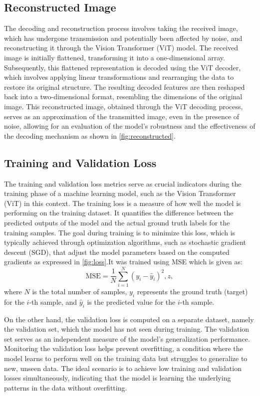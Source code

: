 \documentclass[10pt,twocolumn]{IEEEtran}
\begin{document}
\subsection{Reconstructed Image}
The decoding and reconstruction process involves taking the received image, which has undergone transmission and potentially been affected by noise, and reconstructing it through the Vision Transformer (ViT) model. The received image is initially flattened, transforming it into a one-dimensional array. Subsequently, this flattened representation is decoded using the ViT decoder, which involves applying linear transformations and rearranging the data to restore its original structure. The resulting decoded features are then reshaped back into a two-dimensional format, resembling the dimensions of the original image. This reconstructed image, obtained through the ViT decoding process, serves as an approximation of the transmitted image, even in the presence of noise, allowing for an evaluation of the model's robustness and the effectiveness of the decoding mechanism as shown in \ref{fig:reconstructed}.

\subsection{Training and Validation Loss}
The training and validation loss metrics serve as crucial indicators during the training phase of a machine learning model, such as the Vision Transformer (ViT) in this context. The training loss is a measure of how well the model is performing on the training dataset. It quantifies the difference between the predicted outputs of the model and the actual ground truth labels for the training samples. The goal during training is to minimize this loss, which is typically achieved through optimization algorithms, such as stochastic gradient descent (SGD), that adjust the model parameters based on the computed gradients as expressed in \ref{fig:loss}.It was trained using MSE which is given as:
\begin{equation}
    \text{MSE} = \frac{1}{N} \sum_{i=1}^{N} (y_i - \hat{y}_i)^2,z,
\end{equation}
where \(N\) is the total number of samples, \(y_i\) represents the ground truth (target) for the \(i\)-th sample, and \(\hat{y}_i\) is the predicted value for the \(i\)-th sample.

On the other hand, the validation loss is computed on a separate dataset, namely the validation set, which the model has not seen during training. The validation set serves as an independent measure of the model's generalization performance. Monitoring the validation loss helps prevent overfitting, a condition where the model learns to perform well on the training data but struggles to generalize to new, unseen data. The ideal scenario is to achieve low training and validation losses simultaneously, indicating that the model is learning the underlying patterns in the data without overfitting.
\end{document}
